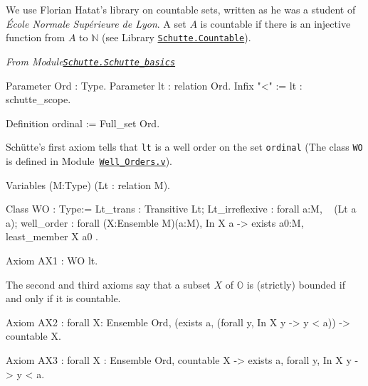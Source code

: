 \label{types:Ord} 

We use Florian Hatat's library on countable sets, written as he was a student of  \emph{\'Ecole Normale Supérieure de Lyon}. A set $A$ is countable if there is an injective function from $A$ to $\mathbb{N}$ (see 
Library \href{../theories/html/hydras.Schutte.Countable.html}%
{\texttt{Schutte.Countable}}).


\vspace{6pt}

\emph{From Module\href{../theories/html/hydras.Schutte.Schutte_basics.html}%
{\texttt{Schutte.Schutte\_basics}}}


\begin{Coqsrc}
Parameter Ord : Type.
Parameter lt : relation Ord.
Infix "<" := lt : schutte_scope.

Definition ordinal := Full_set Ord.
\end{Coqsrc}

Schütte's first axiom tells that \texttt{lt} is a well order on the set 
\texttt{ordinal} (The  class \texttt{WO} is defined in
Module~\href{../theories/html/hydras.Schutte.Well_Orders.html}%
{\texttt{Well\_Orders.v}}).


\label{types:WO}

\begin{Coqsrc}
Variables (M:Type)
         (Lt : relation M).
  
Class WO : Type:=
    {
      Lt_trans : Transitive  Lt;
      Lt_irreflexive : forall a:M, ~ (Lt a a);
      well_order : forall (X:Ensemble M)(a:M),
          In X a ->
          exists a0:M, least_member  X a0
    }.
\end{Coqsrc}



\begin{Coqsrc}
  Axiom AX1 : WO lt.
\end{Coqsrc}

The second and third axioms say that a subset $X$ of $\mathbb{O}$ is
(strictly) bounded if and only if it is countable. 



\begin{Coqsrc}
Axiom AX2 : forall X: Ensemble Ord, 
   (exists a,  (forall y, In X y -> y < a)) ->
   countable X.

Axiom AX3 : forall X : Ensemble Ord,
              countable X -> 
              exists a,  forall y, In X y -> y < a.
\end{Coqsrc}

